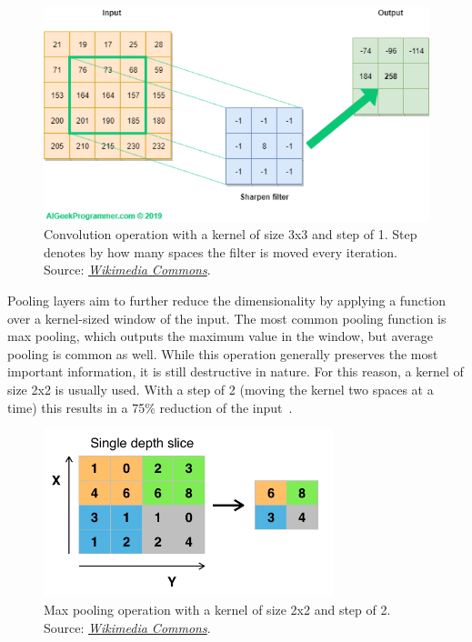 \documentclass[english, he, bc, kiv, iso690alph]{fasthesis}
\begin{document}
\begin{figure}[h]
	\includegraphics[width=\textwidth]{fig/conv.png}
	\caption{Convolution operation with a kernel of size 3x3 and step of 1. Step denotes by how many spaces the filter is moved every iteration. Source: \href{https://commons.wikimedia.org/wiki/File:CNN-filter-animation-1.gif}{\textit{Wikimedia Commons}}.}
\end{figure}

Pooling layers aim to further reduce the dimensionality by applying a function over a kernel-sized window of the input. The most common pooling function is max pooling, which outputs the maximum value in the window, but average pooling is common as well. While this operation generally preserves the most important information, it is still destructive in nature. For this reason, a kernel of size 2x2 is usually used. With a step of 2 (moving the kernel two spaces at a time) this results in a 75\% reduction of the input~\cite{oshea:cnn:15}.

\begin{figure}[ht]
	\centering
	\includegraphics[width=0.75\textwidth]{fig/maxpool.png}
	\caption{Max pooling operation with a kernel of size 2x2 and step of 2. Source: \href{https://commons.wikimedia.org/wiki/File:Max_pooling.png}{\textit{Wikimedia Commons}}.}
\end{figure}
\end{document}
